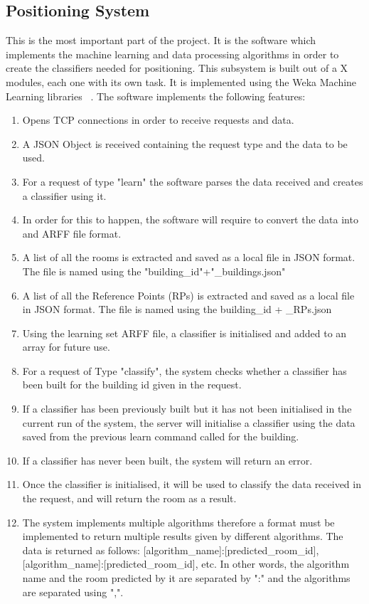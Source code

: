 \subsection{Positioning System}
This is the most important part of the project. It is the software which implements the machine learning and data processing algorithms in order to create the classifiers needed for positioning.
This subsystem is built out of a X modules, each one with its own task. It is implemented using the Weka Machine Learning libraries ~\cite{Weka}. The software implements the following features:
\begin{enumerate}
\item Opens TCP connections in order to receive requests and data.
\item A JSON Object is received containing the request type and the data to be used.
\item For a request of type "learn" the software parses the data received and creates a classifier using it.
\item In order for this to happen, the software will require to convert the data into and ARFF file format.
\item A list of all the rooms is extracted and saved as a local file in JSON format. The file is named using the "building\_id"+"\_buildings.json"
\item A list of all the Reference Points (RPs) is extracted and saved as a local file in JSON format. The file is named using the building\_id + \_RPs.json
\item Using the learning set ARFF file, a classifier is initialised and added to an array for future use.
\item For a request of Type "classify", the system checks whether a classifier has been built for the building id given in the request.
\item If a classifier has been previously built but it has not been initialised in the current run of the system, the server will initialise a classifier using the data saved from the previous learn command called for the building.
\item If a classifier has never been built, the system will return an error.
\item Once the classifier is initialised, it will be used to classify the data received in the request, and will return the room as a result.
\item The system implements multiple algorithms therefore a format must be implemented to return multiple results given by different algorithms. The data is returned as follows: [algorithm\_name]:[predicted\_room\_id],[algorithm\_name]:[predicted\_room\_id], etc. In other words, the algorithm name and the room predicted by it are separated by ":" and the algorithms are separated using ",".

\end{enumerate}
